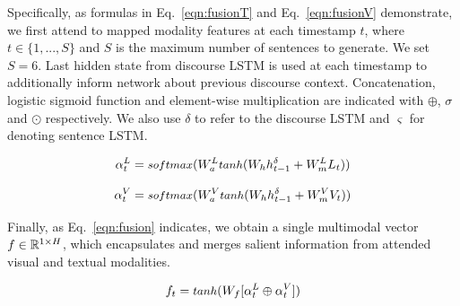 \documentclass[11pt,a4paper]{article}
\newcommand{\R}{\mathbb{R}}
\begin{document}
Specifically, as formulas in Eq.~\ref{eqn:fusionT} and Eq.~\ref{eqn:fusionV} demonstrate, we first attend to mapped modality features at each timestamp $t$, where $t \in \{1, ..., S\}$ and $S$ is the maximum number of sentences to generate.
We set $S=6$.
Last hidden state from discourse LSTM is used at each timestamp to additionally inform network about previous discourse context.
Concatenation, logistic sigmoid function and element-wise multiplication are indicated with $\oplus$, $\sigma$ and $\odot$ respectively.
We also use $\delta$ to refer to the discourse LSTM and $\varsigma$ for denoting sentence LSTM.

\begin{equation}
   \alpha_t\sp{L} = \text{\small $softmax$}( W_a\sp{L} \text{\small $tanh$} (W_h h\sp{\delta}_{t-1} + W_{m}\sp{L} L_t) )
\label{eqn:fusionT}
\end{equation}

\begin{equation}
    \alpha_t\sp{V} = \text{\small $softmax$}( W_a\sp{V} \text{\small $tanh$} (W_h h\sp{\delta}_{t-1} + W_{m}\sp{V} V_t) )
\label{eqn:fusionV}
\end{equation}

Finally, as Eq.~\ref{eqn:fusion} indicates, we obtain a single multimodal vector $f \in \R\sp{1 \times H}$, which encapsulates and merges salient information from attended visual and textual modalities.

\begin{equation}
	f_t = \text{\small $tanh$} (W_f [  \alpha_t\sp{L} \oplus \alpha_t\sp{V} ] )
\label{eqn:fusion}
\end{equation}

\end{document}
